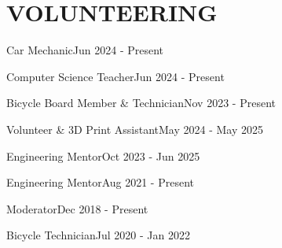 \section*{VOLUNTEERING}

\subtitle{Auto Angels, Bellevue}{Car Mechanic}{Jun 2024 - Present}
\subtitle{Rainier Scholars, Seattle}{Computer Science Teacher}{Jun 2024 - Present}
\subtitle{The Bikery, Seattle}{Bicycle Board Member \& Technician}{Nov 2023 - Present}
\subtitle{Capitol Hill Tool Library, Seattle}{Volunteer \& 3D Print Assistant}{May 2024 - May 2025}
\subtitle{Santa Clara University, Alumni}{Engineering Mentor}{Oct 2023 - Jun 2025}
\subtitle{FIRST Robotics Competition (FRC) 254}{Engineering Mentor}{Aug 2021 - Present}
\subtitle{Reddit Group: r/ControlTheory}{Moderator}{Dec 2018 - Present}
\subtitle{San Jose Bicycle Clinic}{Bicycle Technician}{Jul 2020 - Jan 2022}
